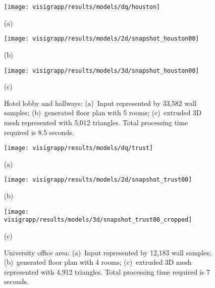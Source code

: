 \documentclass[12pt,onecolumn,oneside]{book}
\begin{document}
\begin{figure}
	\centering
	
	\begin{minipage}[b]{0.4950\linewidth}
	\centerline{\texttt{[image: visigrapp/results/models/dq/houston]}}
	\centerline{(a)}
	\end{minipage}
	\hfill
	\begin{minipage}[b]{0.4950\linewidth}
	\centerline{\texttt{[image: visigrapp/results/models/2d/snapshot\_houston00]}}
	\centerline{(b)}
	\end{minipage}
	\begin{minipage}[b]{0.95\linewidth}
	\centerline{\texttt{[image: visigrapp/results/models/3d/snapshot\_houston00]}}
	\centerline{(c)}
	\end{minipage}

	\caption[Floor plan of a hotel lobby and hallways.]{Hotel lobby and hallways: (a)~Input represented by 33,582 wall samples; (b)~generated floor plan with 5 rooms; (c)~extruded 3D mesh represented with 5,012 triangles.  Total processing time required is 8.5 seconds.}
	\label{fig:visigrapp_results_b}
\end{figure}

\begin{figure}[t]
	\centering
	
	\begin{minipage}[b]{0.495\linewidth}
	\centerline{\texttt{[image: visigrapp/results/models/dq/trust]}}
	\centerline{(a)}
	\end{minipage}
	\hfill
	\begin{minipage}[b]{0.495\linewidth}
	\centerline{\texttt{[image: visigrapp/results/models/2d/snapshot\_trust00]}}
	\centerline{(b)}
	\end{minipage}
	\begin{minipage}[b]{0.95\linewidth}
	\centerline{\texttt{[image: visigrapp/results/models/3d/snapshot\_trust00\_cropped]}}
	\centerline{(c)}
	\end{minipage}

	\caption[Floor plan of a university office area.]{University office area: (a)~Input represented by 12,183 wall samples; (b)~generated floor plan with 4 rooms; (c)~extruded 3D mesh represented with 4,912 triangles.  Total processing time required is 7 seconds.}
	\label{fig:visigrapp_results_c}
\end{figure}
\end{document}
